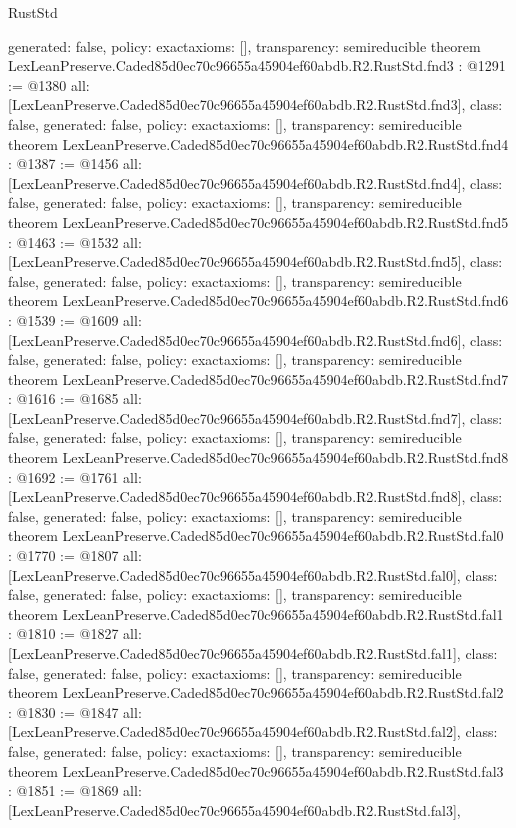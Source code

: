 \begin{lexlean}{RustStd}
\begin{coremodule}
{  generated: false,
  policy: exact{axioms: []},
  transparency: semireducible
}
theorem LexLeanPreserve.Caded85d0ec70c96655a45904ef60abdb.R2.RustStd.fnd3 : @1291 := @1380 {
  all: [LexLeanPreserve.Caded85d0ec70c96655a45904ef60abdb.R2.RustStd.fnd3],
  class: false,
  generated: false,
  policy: exact{axioms: []},
  transparency: semireducible
}
theorem LexLeanPreserve.Caded85d0ec70c96655a45904ef60abdb.R2.RustStd.fnd4 : @1387 := @1456 {
  all: [LexLeanPreserve.Caded85d0ec70c96655a45904ef60abdb.R2.RustStd.fnd4],
  class: false,
  generated: false,
  policy: exact{axioms: []},
  transparency: semireducible
}
theorem LexLeanPreserve.Caded85d0ec70c96655a45904ef60abdb.R2.RustStd.fnd5 : @1463 := @1532 {
  all: [LexLeanPreserve.Caded85d0ec70c96655a45904ef60abdb.R2.RustStd.fnd5],
  class: false,
  generated: false,
  policy: exact{axioms: []},
  transparency: semireducible
}
theorem LexLeanPreserve.Caded85d0ec70c96655a45904ef60abdb.R2.RustStd.fnd6 : @1539 := @1609 {
  all: [LexLeanPreserve.Caded85d0ec70c96655a45904ef60abdb.R2.RustStd.fnd6],
  class: false,
  generated: false,
  policy: exact{axioms: []},
  transparency: semireducible
}
theorem LexLeanPreserve.Caded85d0ec70c96655a45904ef60abdb.R2.RustStd.fnd7 : @1616 := @1685 {
  all: [LexLeanPreserve.Caded85d0ec70c96655a45904ef60abdb.R2.RustStd.fnd7],
  class: false,
  generated: false,
  policy: exact{axioms: []},
  transparency: semireducible
}
theorem LexLeanPreserve.Caded85d0ec70c96655a45904ef60abdb.R2.RustStd.fnd8 : @1692 := @1761 {
  all: [LexLeanPreserve.Caded85d0ec70c96655a45904ef60abdb.R2.RustStd.fnd8],
  class: false,
  generated: false,
  policy: exact{axioms: []},
  transparency: semireducible
}
theorem LexLeanPreserve.Caded85d0ec70c96655a45904ef60abdb.R2.RustStd.fal0 : @1770 := @1807 {
  all: [LexLeanPreserve.Caded85d0ec70c96655a45904ef60abdb.R2.RustStd.fal0],
  class: false,
  generated: false,
  policy: exact{axioms: []},
  transparency: semireducible
}
theorem LexLeanPreserve.Caded85d0ec70c96655a45904ef60abdb.R2.RustStd.fal1 : @1810 := @1827 {
  all: [LexLeanPreserve.Caded85d0ec70c96655a45904ef60abdb.R2.RustStd.fal1],
  class: false,
  generated: false,
  policy: exact{axioms: []},
  transparency: semireducible
}
theorem LexLeanPreserve.Caded85d0ec70c96655a45904ef60abdb.R2.RustStd.fal2 : @1830 := @1847 {
  all: [LexLeanPreserve.Caded85d0ec70c96655a45904ef60abdb.R2.RustStd.fal2],
  class: false,
  generated: false,
  policy: exact{axioms: []},
  transparency: semireducible
}
theorem LexLeanPreserve.Caded85d0ec70c96655a45904ef60abdb.R2.RustStd.fal3 : @1851 := @1869 {
  all: [LexLeanPreserve.Caded85d0ec70c96655a45904ef60abdb.R2.RustStd.fal3],
}
\end{coremodule}
\end{lexlean}
